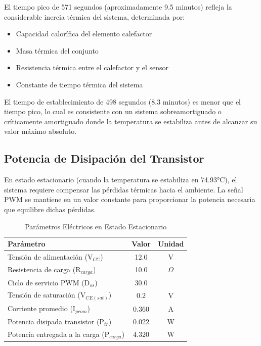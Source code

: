 El tiempo pico de 571 segundos (aproximadamente 9.5 minutos) refleja la considerable inercia térmica del sistema, determinada por:
\begin{itemize}
	\item Capacidad calorífica del elemento calefactor
	\item Masa térmica del conjunto
	\item Resistencia térmica entre el calefactor y el sensor
	\item Constante de tiempo térmica del sistema
\end{itemize}

El tiempo de establecimiento de 498 segundos (8.3 minutos) es menor que el tiempo pico, lo cual es consistente con un sistema sobreamortiguado o críticamente amortiguado donde la temperatura se estabiliza antes de alcanzar su valor máximo absoluto.

\subsection{Potencia de Disipación del Transistor}
En estado estacionario (cuando la temperatura se estabiliza en 74.93°C), el sistema requiere compensar las pérdidas térmicas hacia el ambiente. La señal PWM se mantiene en un valor constante para proporcionar la potencia necesaria que equilibre dichas pérdidas.

\begin{table}[H]
	\centering
	\caption{Parámetros Eléctricos en Estado Estacionario}
	\label{tab:parametros_electricos}
	\begin{tabular}{|l|c|c|}
		\hline
		\textbf{Parámetro} & \textbf{Valor} & \textbf{Unidad} \\ \hline
		Tensión de alimentación (V$_{CC}$) & 12.0 & V \\ \hline
		Resistencia de carga (R$_{carga}$) & 10.0 & $\Omega$ \\ \hline
		Ciclo de servicio PWM (D$_{ss}$) & 30.0 & \\ \hline
		Tensión de saturación (V$_{CE(sat)}$) & 0.2 & V \\ \hline
		Corriente promedio (I$_{prom}$) & 0.360 & A \\ \hline
		Potencia disipada transistor (P$_{tr}$) & 0.022 & W \\ \hline
		Potencia entregada a la carga (P$_{carga}$) & 4.320 & W \\ \hline
	\end{tabular}
\end{table}

